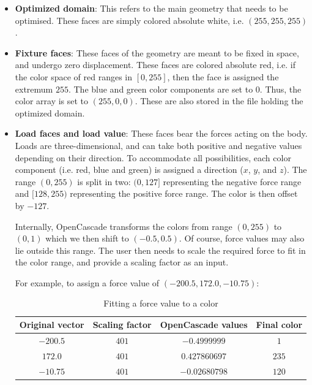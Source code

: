 \begin{itemize}
	\item \textbf{Optimized domain}: This refers to the main geometry that needs to be optimised. These faces are simply colored absolute white, i.e. $(255, 255, 255)$.
	\item \textbf{Fixture faces}: These faces of the geometry are meant to be fixed in space, and undergo zero displacement. These faces are colored absolute red, i.e. if the color space of red ranges in {$[0, 255]$}, then the face is assigned the extremum $255$. The blue and green color components are set to $0$. Thus, the color array is set to $(255, 0, 0)$. These are also stored in the file holding the optimized domain.
	\item \textbf{Load faces and load value}: These faces bear the forces acting on the body. Loads are three-dimensional, and can take both positive and negative values depending on their direction. To accommodate all possibilities, each color component (i.e. red, blue and green) is assigned a direction ($x$, $y$, and $z$). The range $(0, 255)$ is split in two: $(0, 127]$ representing the negative force range and $[128, 255)$ representing the positive force range. The color is then offset by $-127$. 

Internally, OpenCascade transforms the colors from range $(0, 255)$ to $(0,1)$ which we then shift to $(-0.5, 0.5)$. Of course, force values may also lie outside this range. The user then needs to scale the required force to fit in the color range, and provide a scaling factor as an input.

For example, to assign a force value of $(-200.5, 172.0, -10.75)$:

\begin{table}[h!]
	\begin{center}
		\caption{Fitting a force value to a color}
		\label{LoadFaceExample}
		\begin{tabular}{cccc}
			\toprule
			{\small Original vector} & {\small Scaling factor} & {\small OpenCascade values} & {\small Final color}\\
			\midrule
			$-200.5$ & $401$ & $-0.4999999$ & $1$\\
			$172.0$  & $401$ & $0.427860697$  & $235$\\
			$-10.75$ & $401$ & $-0.02680798$   & $120$\\
			\bottomrule
		\end{tabular}
	\end{center}
\end{table}


\end{itemize}

